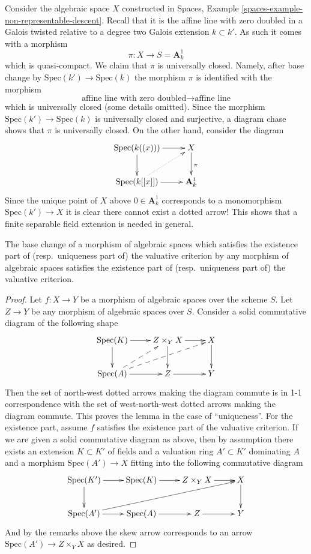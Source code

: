 \begin{example}
\label{example-finite-separable-needed}
Consider the algebraic space $X$ constructed in
Spaces, Example \ref{spaces-example-non-representable-descent}.
Recall that it is the affine line with zero doubled in a Galois twisted
relative to a degree two Galois extension $k \subset k'$.
As such it comes with a morphism
$$
\pi : X \longrightarrow S = \mathbf{A}^1_k
$$
which is quasi-compact. We claim that $\pi$ is universally closed.
Namely, after base change by $\text{Spec}(k') \to \text{Spec}(k)$
the morphism $\pi$ is identified with the morphism
$$
\text{affine line with zero doubled}
\longrightarrow
\text{affine line}
$$
which is universally closed (some details omitted). Since the morphism
$\text{Spec}(k') \to \text{Spec}(k)$ is universally closed and
surjective, a diagram chase shows that $\pi$ is universally closed.
On the other hand, consider the diagram
$$
\xymatrix{
\text{Spec}(k((x))) \ar[r] \ar[d] & X \ar[d]^\pi \\
\text{Spec}(k[[x]]) \ar[r] \ar@{..>}[ru] & \mathbf{A}^1_k
}
$$
Since the unique point of $X$ above $0 \in \mathbf{A}^1_k$
corresponds to a monomorphism $\text{Spec}(k') \to X$
it is clear there cannot exist a dotted arrow! This shows that
a finite separable field extension is needed in general.
\end{example}

\begin{lemma}
\label{lemma-base-change-valuative-criteria}
The base change of a morphism of algebraic spaces which satisfies the
existence part of (resp.\ uniqueness part of) the valuative criterion
by any morphism of algebraic spaces satisfies the
existence part of (resp.\ uniqueness part of) the valuative criterion.
\end{lemma}

\begin{proof}
Let $f : X \to Y$ be a morphism of algebraic spaces over the scheme $S$.
Let $Z \to Y$ be any morphism of algebraic spaces over $S$.
Consider a solid commutative diagram of the following shape
$$
\xymatrix{
\text{Spec}(K) \ar[r] \ar[d] & Z \times_Y X \ar[r] \ar[d] & X \ar[d] \\
\text{Spec}(A) \ar[r] \ar@{-->}[ru] \ar@{-->}[rru] & Z \ar[r] & Y
}
$$
Then the set of north-west dotted arrows making the diagram commute
is in 1-1 correspondence with the set of west-north-west dotted arrows
making the diagram commute. This proves the lemma in the case of
``uniqueness''. For the existence part, assume $f$ satisfies the existence
part of the valuative criterion. If we are given a solid commutative
diagram as above, then by assumption there exists an extension $K \subset K'$
of fields and a valuation ring $A' \subset K'$ dominating $A$ and
a morphism $\text{Spec}(A') \to X$ fitting into the following commutative
diagram
$$
\xymatrix{
\text{Spec}(K') \ar[r] \ar[d] &
\text{Spec}(K) \ar[r] & Z \times_Y X \ar[r] & X \ar[d] \\
\text{Spec}(A') \ar[r] \ar[rrru] & \text{Spec}(A) \ar[r] & Z \ar[r] & Y
}
$$
And by the remarks above the skew arrow corresponds to an arrow
$\text{Spec}(A') \to Z \times_Y X$ as desired.
\end{proof}

